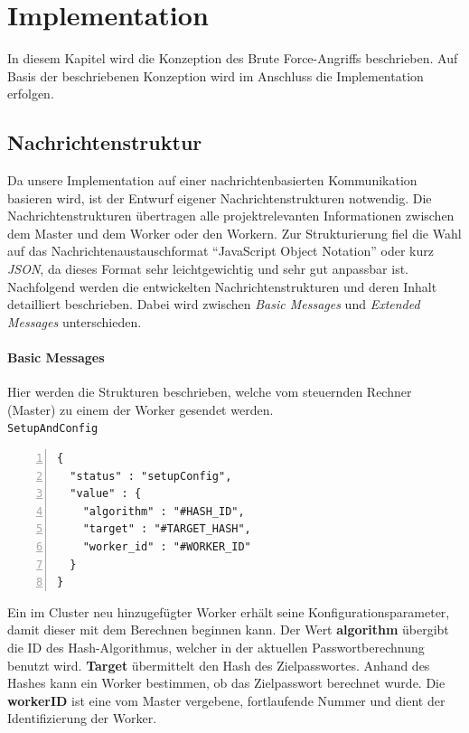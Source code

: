 \chapter{Implementation}
\label{implementation}
In diesem Kapitel wird die Konzeption des Brute Force-Angriffs beschrieben. Auf Basis der beschriebenen Konzeption wird im Anschluss die Implementation erfolgen. 
\section{Nachrichtenstruktur}
Da unsere Implementation auf einer nachrichtenbasierten Kommunikation basieren wird, ist der Entwurf eigener Nachrichtenstrukturen notwendig. Die Nachrichtenstrukturen übertragen alle projektrelevanten Informationen zwischen dem Master und dem Worker oder den Workern. Zur Strukturierung fiel die Wahl auf das Nachrichtenaustauschformat \enquote{JavaScript Object Notation} oder kurz \emph{JSON}, da dieses Format sehr leichtgewichtig und sehr gut anpassbar ist. \\
Nachfolgend werden die entwickelten Nachrichtenstrukturen und deren Inhalt detailliert beschrieben. Dabei wird zwischen \emph{Basic Messages} und \emph{Extended Messages} unterschieden. 

\subsubsection{Basic Messages}
Hier werden die Strukturen beschrieben, welche vom steuernden Rechner (Master) zu einem der Worker gesendet werden.\\

\texttt{SetupAndConfig}
\begin{lstlisting}[basicstyle=\ttfamily,numbers=left,numberstyle=\footnotesize\ttfamily,backgroundcolor=\color{sourcegray}]
{
  "status" : "setupConfig",
  "value" : {
    "algorithm" : "#HASH_ID",
    "target" : "#TARGET_HASH", 
    "worker_id" : "#WORKER_ID"
  }
}
\end{lstlisting}
Ein im Cluster neu hinzugefügter Worker erhält seine Konfigurationsparameter, damit dieser mit dem Berechnen beginnen kann. 
Der Wert \textbf{algorithm} übergibt die ID des Hash-Algorithmus, welcher in der aktuellen Passwortberechnung benutzt wird. \textbf{Target} übermittelt den Hash des Zielpasswortes. Anhand des Hashes kann ein Worker bestimmen, ob das Zielpasswort berechnet wurde. Die \textbf{workerID} ist eine vom Master vergebene, fortlaufende Nummer und dient der Identifizierung der Worker.\\

